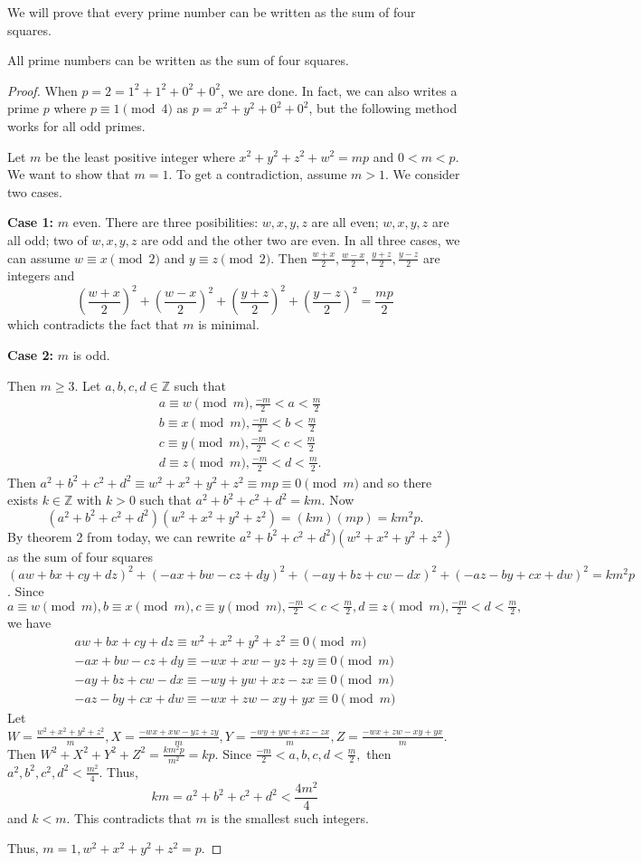 \documentclass{ximera}
\begin{document}
We will prove that every prime number can be written as the sum of four squares. 
\begin{theorem}[Lagrange, 1770]
 All prime numbers can be written as the sum of four squares.
\end{theorem}
\begin{proof}
 When $p=2=1^2+1^2+0^2+0^2$, we are done. In fact, we can also writes a prime $p$ where $p\equiv 1 \pmod 4$ as $p=x^2+y^2+0^2+0^2$, but the following method works for all odd primes. 
 
 Let $m$ be the least positive integer where $x^2+y^2+z^2+w^2=mp$ and $0<m<p$. We want to show that $m=1$. To get a contradiction, assume $m>1$. We consider two cases.

{\bf Case 1:} $m$ even. There are three posibilities: $w,x,y,z$ are all even;  $w,x,y,z$ are all odd; two of $w,x,y,z$ are odd and the other two are even. In all three cases, we can assume $w\equiv x \pmod 2$ and $y\equiv z \pmod 2$. 
Then $\frac{w+x}{2},\frac{w-x}{2},\frac{y+z}{2},\frac{y-z}{2}$ are integers and \[\left(\frac{w+x}{2}\right)^2+\left(\frac{w-x}{2}\right)^2+\left(\frac{y+z}{2}\right)^2+\left(\frac{y-z}{2}\right)^2=\frac{mp}{2}\] which contradicts the fact that $m$ is minimal.

{\bf Case 2:} $m$ is odd.  

Then $m\geq 3.$ Let $a,b,c,d\in\mathbb{Z}$ such that 
\begin{align*}
&a\equiv w\pmod m, \frac{-m}{2}<a<\frac{m}{2}\\
&b\equiv x\pmod m, \frac{-m}{2}<b<\frac{m}{2}\\
&c\equiv y\pmod m, \frac{-m}{2}<c<\frac{m}{2}\\
&d\equiv z\pmod m, \frac{-m}{2}<d<\frac{m}{2}.
\end{align*}
Then $a^2+b^2+c^2+d^2\equiv w^2+x^2+y^2+z^2\equiv mp\equiv 0\pmod m$ and so there exists $k\in\mathbb{Z}$ with $k>0$ such that $a^2+b^2+c^2+d^2=km$.
Now \[(a^2+b^2+c^2+d^2)( w^2+x^2+y^2+z^2)=(km)(mp)=km^2p.\]
By theorem 2 from today, we can rewrite $a^2+b^2+c^2+d^2)( w^2+x^2+y^2+z^2)$ as the sum of four squares 
$(aw+bx+cy+dz)^2+(-ax+bw-cz+dy)^2+(-ay+bz+cw-dx)^2+(-az-by+cx+dw)^2=km^2p$. Since $a\equiv w\pmod m, b\equiv x\pmod m, c\equiv y\pmod m, \frac{-m}{2}<c<\frac{m}{2}, d\equiv z\pmod m, \frac{-m}{2}<d<\frac{m}{2},$ we have 
\begin{align*}
 aw+bx+cy+dz\equiv w^2+x^2+y^2+z^2\equiv 0 \pmod m\\
-ax+bw-cz+dy\equiv -wx+xw-yz+zy\equiv 0\pmod m\\
-ay+bz+cw-dx\equiv -wy+yw+xz-zx\equiv 0\pmod m\\
-az-by+cx+dw\equiv -wx+zw-xy+yx\equiv 0\pmod m
\end{align*}
Let $W=\frac{w^2+x^2+y^2+z^2}{m}, X=\frac{-wx+xw-yz+zy}{m}, Y=\frac{-wy+yw+xz-zx}{m}, Z=\frac{-wx+zw-xy+yx}{m}$. Then $W^2+X^2+Y^2+Z^2=\frac{km^2p}{m^2}=kp.$ Since $\frac{-m}{2}<a,b,c,d<\frac{m}{2},$ then $a^2,b^2,c^2,d^2<\frac{m^2}{4}$. Thus, \[km=a^2+b^2+c^2+d^2<\frac{4m^2}{4}\] and $k<m$. This contradicts that $m$ is the smallest such integers.

Thus, $m=1, w^2+x^2+y^2+z^2=p$.
\end{proof}
\end{document}
